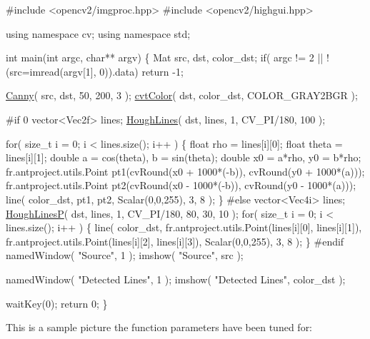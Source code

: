 \begin{DoxyPre}
\begin{DoxyCode}
\textcolor{preprocessor}{#include <opencv2/imgproc.hpp>}
\textcolor{preprocessor}{#include <opencv2/highgui.hpp>}

\textcolor{keyword}{using namespace }cv;
\textcolor{keyword}{using namespace }std;

\textcolor{keywordtype}{int} main(\textcolor{keywordtype}{int} argc, \textcolor{keywordtype}{char}** argv)
\{
    Mat src, dst, color\_dst;
    \textcolor{keywordflow}{if}( argc != 2 || !(src=imread(argv[1], 0)).data)
        \textcolor{keywordflow}{return} -1;

    \hyperlink{group__imgproc__feature_gae85c4c5d2fd8006e4194e3ee73d2277d}{Canny}( src, dst, 50, 200, 3 );
    \hyperlink{group__imgproc__misc_gaab99985581c43cce9df680e6586cb9ef}{cvtColor}( dst, color\_dst, COLOR\_GRAY2BGR );

\textcolor{preprocessor}{#if 0}
    vector<Vec2f> lines;
    \hyperlink{group__imgproc__feature_ga304555e089d6883caf9ac96ebef50718}{HoughLines}( dst, lines, 1, CV\_PI/180, 100 );

    \textcolor{keywordflow}{for}( \textcolor{keywordtype}{size\_t} i = 0; i < lines.size(); i++ )
    \{
        \textcolor{keywordtype}{float} rho = lines[i][0];
        \textcolor{keywordtype}{float} theta = lines[i][1];
        \textcolor{keywordtype}{double} a = cos(theta), b = sin(theta);
        \textcolor{keywordtype}{double} x0 = a*rho, y0 = b*rho;
        fr.antproject.utils.Point pt1(cvRound(x0 + 1000*(-b)),
                  cvRound(y0 + 1000*(a)));
        fr.antproject.utils.Point pt2(cvRound(x0 - 1000*(-b)),
                  cvRound(y0 - 1000*(a)));
        line( color\_dst, pt1, pt2, Scalar(0,0,255), 3, 8 );
    \}
\textcolor{preprocessor}{#else}
    vector<Vec4i> lines;
    \hyperlink{group__imgproc__feature_gaac39ae22179f4396e7034f6d2a4cce1e}{HoughLinesP}( dst, lines, 1, CV\_PI/180, 80, 30, 10 );
    \textcolor{keywordflow}{for}( \textcolor{keywordtype}{size\_t} i = 0; i < lines.size(); i++ )
    \{
        line( color\_dst, fr.antproject.utils.Point(lines[i][0], lines[i][1]),
            fr.antproject.utils.Point(lines[i][2], lines[i][3]), Scalar(0,0,255), 3, 8 );
    \}
\textcolor{preprocessor}{#endif}
    namedWindow( \textcolor{stringliteral}{"Source"}, 1 );
    imshow( \textcolor{stringliteral}{"Source"}, src );

    namedWindow( \textcolor{stringliteral}{"Detected Lines"}, 1 );
    imshow( \textcolor{stringliteral}{"Detected Lines"}, color\_dst );

    waitKey(0);
    \textcolor{keywordflow}{return} 0;
\}
\end{DoxyCode}
 \end{DoxyPre}
 This is a sample picture the function parameters have been tuned for\+: 

